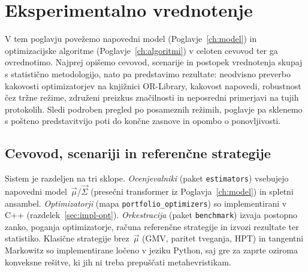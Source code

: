 \chapter{Eksperimentalno vrednotenje}
\label{ch:eksperiment}

V tem poglavju povežemo napovedni model (Poglavje~\ref{ch:model}) in optimizacijske algoritme (Poglavje~\ref{ch:algoritmi}) v celoten cevovod ter ga ovrednotimo. Najprej opišemo cevovod, scenarije in postopek vrednotenja skupaj s statistično metodologijo, nato pa predstavimo rezultate: neodvisno preverbo kakovosti optimizatorjev na knjižnici OR-Library, kakovost napovedi, robustnost čez tržne režime, združeni preizkus značilnosti in neposredni primerjavi na tujih protokolih. Sledi podroben pregled po posameznih režimih, poglavje pa sklenemo s pošteno predstavitvijo poti do končne zasnove in opombo o ponovljivosti.

\section{Cevovod, scenariji in referenčne strategije}
\label{sec:pregled}

Sistem je razdeljen na tri sklope. \emph{Ocenjevalniki} (paket \texttt{estimators}) vsebujejo napovedni model~$\vec{\mu}$/$\vec{\Sigma}$ (presečni transformer iz Poglavja~\ref{ch:model}) in spletni ansambel. \emph{Optimizatorji} (mapa \texttt{portfolio\_optimizers}) so implementirani v C++ (razdelek~\ref{sec:impl-opt}). \emph{Orkestracija} (paket \texttt{benchmark}) izvaja postopno zanko, poganja optimizatorje, računa referenčne strategije in izvozi rezultate ter statistiko. Klasične strategije brez~$\vec{\mu}$ (GMV, paritet tveganja, HPT) in tangentni Markowitz so implementirane ločeno v jeziku Python, saj gre za zaprte oziroma konveksne rešitve, ki jih ni treba prepuščati metahevristikam.

